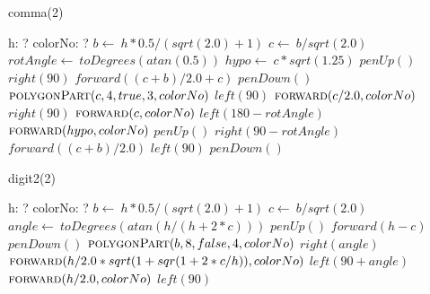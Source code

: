 \documentclass[a4paper,10pt]{article}
\begin{document}
\begin{algorithm}
\caption{comma(2)}
\begin{algorithmic}[5]
\State {}
\State {}
    \State h: ?
    \State colorNo: ?
  \EndDecl
  \State \(b\gets\ h*0.5/(sqrt(2.0)+1)\)
  \State \(c\gets\ b/sqrt(2.0)\)
  \State \(rotAngle\gets\ toDegrees(atan(0.5))\)
  \State \(hypo\gets\ c*sqrt(1.25)\)
  \State \(penUp()\)
  \State \(right(90)\)
  \State \(forward((c+b)/2.0+c)\)
  \State \(penDown()\)
  \State {}
  \State {}
  \State \(\Call{polygonPart}{c,4,true,3,colorNo}\)
  \State \(left(90)\)
  \State \(\Call{forward}{c/2.0,colorNo}\)
  \State \(right(90)\)
  \State \(\Call{forward}{c,colorNo}\)
  \State \(left(180-rotAngle)\)
  \State \(\Call{forward}{hypo,colorNo}\)
  \State \(penUp()\)
  \State \(right(90-rotAngle)\)
  \State \(forward((c+b)/2.0)\)
  \State \(left(90)\)
  \State \(penDown()\)
\EndProcedure
\end{algorithmic}
\end{algorithm}


\begin{algorithm}
\caption{digit2(2)}
\begin{algorithmic}[5]
\State {}
\State {}
    \State h: ?
    \State colorNo: ?
  \EndDecl
  \State \(b\gets\ h*0.5/(sqrt(2.0)+1)\)
  \State \(c\gets\ b/sqrt(2.0)\)
  \State \(angle\gets\ toDegrees(atan(h/(h+2*c)))\)
  \State \(penUp()\)
  \State \(forward(h-c)\)
  \State \(penDown()\)
  \State {}
  \State {}
  \State \(\Call{polygonPart}{b,8,false,4,colorNo}\)
  \State \(right(angle)\)
  \State \(\Call{forward}{h/2.0*sqrt(1+sqr(1+2*c/h)),colorNo}\)
  \State \(left(90+angle)\)
  \State \(\Call{forward}{h/2.0,colorNo}\)
  \State \(left(90)\)
\EndProcedure
\end{algorithmic}
\end{algorithm}
\end{document}
